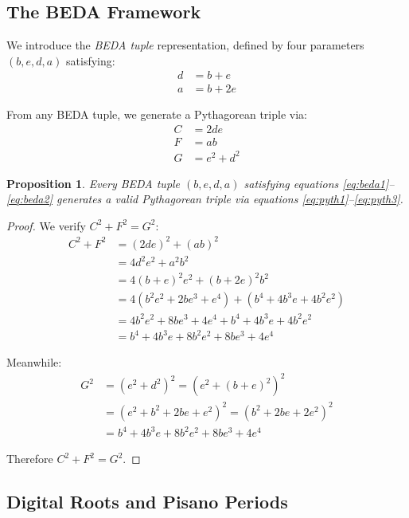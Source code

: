 \documentclass[12pt]{article}
\newtheorem{proposition}[theorem]{Proposition}
\begin{document}
\subsection{The BEDA Framework}

We introduce the \emph{BEDA tuple} representation, defined by four parameters $(b, e, d, a)$ satisfying:
\begin{align}
d &= b + e \label{eq:beda1}\\
a &= b + 2e \label{eq:beda2}
\end{align}

From any BEDA tuple, we generate a Pythagorean triple via:
\begin{align}
C &= 2de \label{eq:pyth1}\\
F &= ab \label{eq:pyth2}\\
G &= e^2 + d^2 \label{eq:pyth3}
\end{align}

\begin{proposition}
Every BEDA tuple $(b, e, d, a)$ satisfying equations \eqref{eq:beda1}--\eqref{eq:beda2} generates a valid Pythagorean triple via equations \eqref{eq:pyth1}--\eqref{eq:pyth3}.
\end{proposition}

\begin{proof}
We verify $C^2 + F^2 = G^2$:
\begin{align*}
C^2 + F^2 &= (2de)^2 + (ab)^2 \\
&= 4d^2e^2 + a^2b^2 \\
&= 4(b+e)^2e^2 + (b+2e)^2b^2 \\
&= 4(b^2e^2 + 2be^3 + e^4) + (b^4 + 4b^3e + 4b^2e^2) \\
&= 4b^2e^2 + 8be^3 + 4e^4 + b^4 + 4b^3e + 4b^2e^2 \\
&= b^4 + 4b^3e + 8b^2e^2 + 8be^3 + 4e^4
\end{align*}

Meanwhile:
\begin{align*}
G^2 &= (e^2 + d^2)^2 = (e^2 + (b+e)^2)^2 \\
&= (e^2 + b^2 + 2be + e^2)^2 = (b^2 + 2be + 2e^2)^2 \\
&= b^4 + 4b^3e + 8b^2e^2 + 8be^3 + 4e^4
\end{align*}

Therefore $C^2 + F^2 = G^2$.
\end{proof}

\subsection{Digital Roots and Pisano Periods}
\end{document}
